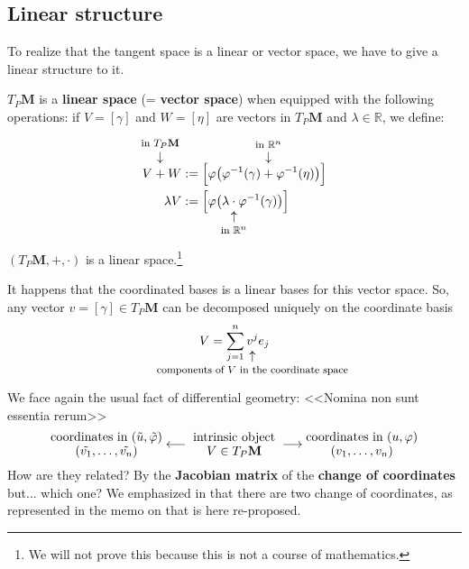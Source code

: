 \documentclass[../main.tex]{subfiles}
\begin{document}
\subsection{Linear structure}
To realize that the tangent space is a linear or vector space, we have to give a linear structure to it.
\begin{definition}
$T_P\mathbf{M}$ is a \textbf{linear space} (= \textbf{vector space}) when equipped with the following operations: if $V=[\gamma]$ and $W=[\eta]$ are vectors in $T_P\mathbf{M}$ and $\lambda\in\mathbb{R}$, we define:
\[
\begin{split}
V\overset{\mathclap{\tikz \node {$\downarrow$} node [above=1ex] {\footnotesize in $T_P\mathbf{M}$};}}{+}W&:=\Big[\varphi\big(\varphi^{-1}(\gamma)\overset{\mathclap{\tikz \node {$\downarrow$} node [above=1ex] {\footnotesize in $\mathbb{R}^n$};}}{+}\varphi^{-1}(\eta)\big)\Big]\\
\lambda V&:=\Big[\varphi\big(\lambda \underset{\mathclap{\tikz \node {$\uparrow$} node [below=1ex] {\footnotesize in $\mathbb{R}^n$};}}{\cdot} \varphi^{-1}(\gamma)\big)\Big]
\end{split}
\]
$(T_P\mathbf{M},+,\cdot)$ is a linear space.\footnote{We will not prove this because this is not a course of mathematics.}
\end{definition}
It happens that the coordinated bases is a linear bases for this vector space. So, any vector $v=[\gamma]\in T_P\mathbf{M}$ can be decomposed uniquely on the coordinate basis
\[
V=\sum_{j=1}^n \underset{\mathclap{\tikz \node {$\uparrow$} node [below=1ex] {\footnotesize components of $V$ in the coordinate space};}}{v^j} e_j
\]
We face again the usual fact of differential geometry: <<Nomina non sunt essentia rerum>>
\[
\text{\parbox{3.125 cm}{\centering coordinates in $(\tilde{u},\tilde{\varphi})$\\[-1pt]  $(\tilde{v_1},\dots,\tilde{v_n})$}} \longleftarrow {\parbox{2.5 cm}{\centering intrinsic object\\[-1pt]  $V \in T_P\mathbf{M}$}} \longrightarrow {\text{\parbox{3.125 cm}{\centering coordinates in $(u,\varphi)$ \\[-1pt] $(v_1,\dots,v_n$)}}}
\]
How are they related? By the \textbf{Jacobian matrix} of the \textbf{change of coordinates} but... which one? We emphasized in  that there are two change of coordinates, as represented in the memo on  that is here re-proposed. 
\end{document}
